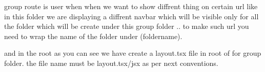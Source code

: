 group route is user when when we want to show diffrent thing on certain url like in this folder we are displaying a diffrent navbar which will be visible only for all the folder which will be create under this group folder .. to make such url you need to wrap the name of the folder under (foldername).

and in the root as you can see we have create a layout.tsx file in root of for group folder. the file name must be layout.tsx/jsx as per next conventions. 

